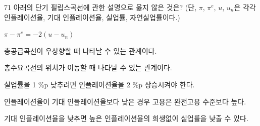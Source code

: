 \begin{question}{71}
아래의 단기 필립스곡선에 관한 설명으로 옳지 않은 것은? (단, $\pi$, $\pi^{e}$, $u$, $u_{n}$은 각각 인플레이션율, 기대 인플레이션율, 실업률, 자연실업률이다.)
\begin{framedtext}
\centering $\pi-\pi^{e}=-2(u-u_{n})$
\end{framedtext}
\begin{choices}
  \item 총공급곡선이 우상향할 때 나타날 수 있는 관계이다.
  \item 총수요곡선의 위치가 이동할 때 나타날 수 있는 관계이다.
  \item 실업률을 1 \%p 낮추려면 인플레이션율을 2 \%p 상승시켜야 한다.
  \item 인플레이션율이 기대 인플레이션율보다 낮은 경우 고용은 완전고용 수준보다 높다.
  \item 기대 인플레이션율을 낮추면 높은 인플레이션율의 희생없이 실업률을 낮출 수 있다.
\end{choices}
\end{question}
